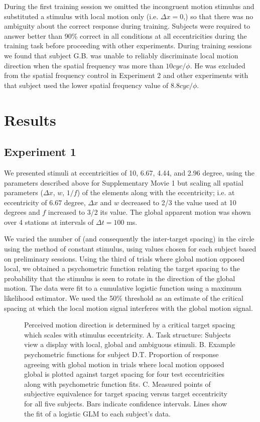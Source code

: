 \documentclass[11pt]{amsart}
\begin{document}
During the first training session we omitted the incongruent motion
stimulus and substituted a stimulus with local motion only
(i.e. ${\Delta}x = 0$,) so that there was no ambiguity about the
correct response during training. Subjects were required to answer
better than 90\% correct in all conditions at all eccentricities
during the training task before proceeding with other
experiments. During training sessions we found that subject G.B. was
unable to reliably discriminate local motion direction when the
spatial frequency was more than $10 cyc/\phi$. He was excluded from
the spatial frequency control in Experiment 2 and other experiments
with that subject used the lower spatial frequency value of $8.8
cyc/\phi$.
 
\section{Results}

\subsection{Experiment 1}

We presented stimuli at eccentricities of 10, 6.67, 4.44, and 2.96
degree, using the parameters described above for Supplementary Movie 1
but scaling all spatial parameters (${\Delta}x$, $w$, $1/f$) of the
elements along with the eccentricity; i.e. at eccentricity of 6.67
degree, ${\Delta}x$ and $w$ decreased to 2/3 the value used at 10
degrees and $f$ increased to 3/2 its value. The global apparent motion
was shown over 4 stations at intervals of ${\Delta}t=100$ ms.

We varied the number of (and consequently the inter-target
spacing) in the circle using the method of constant stimulus, using
values chosen for each subject based on preliminary sessions.  Using
the third of trials where global motion opposed local, we obtained a
psychometric function relating the target spacing to the probability
that the stimulus is seen to rotate in the direction of the global
motion. The data were fit to a cumulative logistic function using a
maximum likelihood estimator. We used the 50\% threshold as an estimate of the
critical spacing at which the local motion signal interferes with the
global motion signal.

\begin{figure}
  \caption{Perceived motion direction is determined by a critical target spacing
    which scales with stimulus eccentricity. A. Task structure:
    Subjects view a display with local, global and
    ambiguous stimuli. B. Example psychometric functions for subject D.T. Proportion
    of response agreeing with global motion in trials where local motion opposed
    global is plotted against target spacing for four test
    eccentricities along with psychometric function fits. C. Measured
    points of subjective equivalence for target spacing versus target eccentricity for all
    five subjects. Bars indicate confidence intervals. Lines show the
    fit of a logistic GLM to each subject's data. }
\end{figure}
\end{document}
